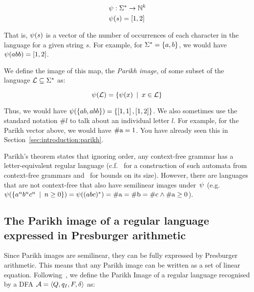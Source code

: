 \documentclass[acmsmall,review,anonymous,screen]{acmart}\settopmatter{printfolios=true,printccs=false,printacmref=true}
\theoremstyle{definition}
\begin{document}
$$
\begin{aligned}
& \ParikhMap: \MapFromTo{\Strings}{\natural^k} \\
& \ParikhMap(s) = \VectorLiteral{\#a_1(s), \#a_2(s), \ldots, \#a_k(s)}
\end{aligned}
$$

That is, $\ParikhMap(s)$ is a vector of the number of occurrences of each
character in the language for a given string $s$. For example, for  $\Strings =
\Set{a, b}$, we would have $\ParikhMap(abb) = \VectorLiteral{1, 2}$.

We define the image of this map, the \textit{Parikh image}, of some subset of
the language $\Language \subseteq \Strings$ as:

\[
\ParikhMap(\Language) = \Set{\ParikhMap(x) \SuchThat x \in \Language}
\]

Thus, we would have $\ParikhMap(\left\{ab, abb\right\}) = \left\{\left[1,
1\right], \left[1, 2\right]\right\}$. We also sometimes use the standard
notation $\#l$ to talk about an individual letter $l$. For example, for the Parikh vector above, we would have $\CountOf{a} = 1$. You have already seen 
this in Section~\ref{sec:introduction:parikh}.

Parikh's theorem states that ignoring order, any context-free grammar has a
letter-equivalent regular language (c.f.~\cite{construction} for a construction of
such automata from context-free grammars and~\cite{bounds} for bounds on its size). However, there are languages that are
not context-free that also have semilinear images under~$\ParikhMap$ (e.g.
$\ParikhMap(\Set{a^nb^nc^n \SuchThat n \geq 0}) = \ParikhMap((abc)^*) = \CountOf{a} =
\CountOf{b} = \CountOf{c} \land \CountOf{a} \geq 0$).

\subsection{The Parikh image of a regular language expressed in Presburger arithmetic}

Since Parikh images are semilinear, they can be fully expressed by Presburger
arithmetic. This means that any Parikh image can be written as a set of linear
equation. Following~\cite{generate-parikh-image}, we define the Parikh Image of
a regular language recognised by a DFA $\Automaton = \AutomatonTuple$ as:
\end{document}
